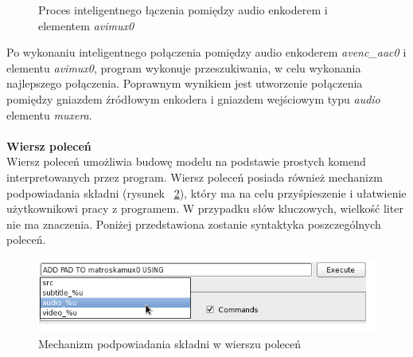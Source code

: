 \documentclass[12pt]{article}
\begin{document}
\begin{itemize}
\begin{figure}[H]
  \caption{Proces inteligentnego łączenia pomiędzy audio enkoderem i elementem \textit{avimux0}}
  \label{fig:aiConnectionProcess}
\end{figure}
Po wykonaniu inteligentnego połączenia pomiędzy audio enkoderem \textit{avenc\_aac0} i elementu \textit{avimux0}, program wykonuje przeszukiwania, w celu wykonania najlepszego połączenia. Poprawnym wynikiem jest utworzenie połączenia pomiędzy gniazdem źródłowym enkodera i gniazdem wejściowym typu \textit{audio} elementu \textit{muxera}.
\end{itemize}\paragraph{}\vspace{-3mm}
\textbf{Wiersz poleceń} \\
Wiersz poleceń umożliwia budowę modelu na podstawie prostych komend interpretowanych przez program. Wiersz poleceń posiada również mechanizm podpowiadania składni (rysunek ~\ref{fig:commandLine}), który ma na celu przyśpieszenie i ułatwienie użytkownikowi pracy z programem. W przypadku słów kluczowych, wielkość liter nie ma znaczenia. Poniżej przedstawiona zostanie syntaktyka poszczególnych poleceń. 
\begin{figure}[H]
  \includegraphics[width=140mm]{img/command-line.png}
  \caption{Mechanizm podpowiadania składni w wierszu poleceń}
  \label{fig:commandLine}
\end{figure}
\end{document}
